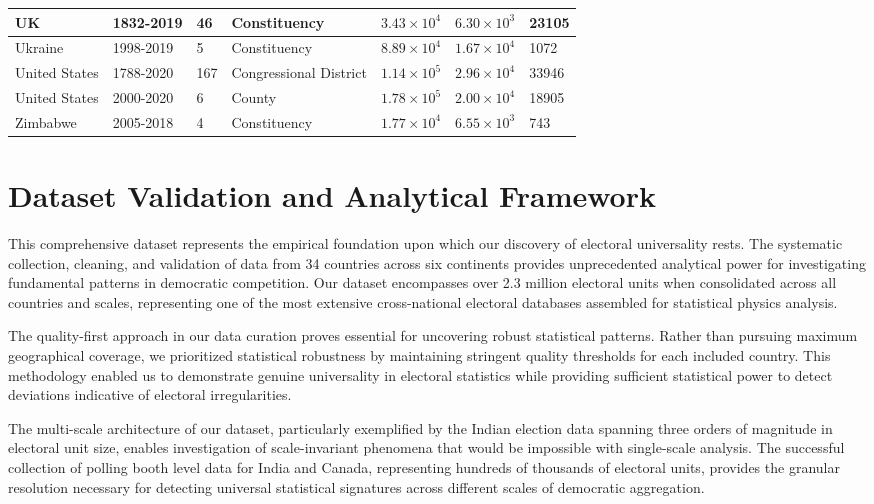 \begin{table}[h]
{\begin{tabular}{|l|l|l|l|l|l|l|}
    UK & 1832-2019 & 46 & Constituency & $3.43\times 10^{4}$ & $6.30\times 10^{3}$ & 23105\\ \hline
    Ukraine & 1998-2019 & 5 & Constituency & $8.89\times 10^{4}$ & $1.67\times 10^{4}$ & 1072\\ \hline
    United States & 1788-2020 & 167 & Congressional District & $1.14\times 10^{5}$ & $2.96\times 10^{4}$ & 33946\\ \hline
    United States & 2000-2020 & 6 & County & $1.78\times 10^{5}$ & $2.00\times 10^{4}$ & 18905\\ \hline
    Zimbabwe & 2005-2018 & 4 & Constituency & $1.77\times 10^{4}$ & $6.55\times 10^{3}$ & 743\\ \hline
    \end{tabular}
    }
    \end{table}
    
\newpage
\section{Dataset Validation and Analytical Framework}

This comprehensive dataset represents the empirical foundation upon which our discovery of electoral universality rests. The systematic collection, cleaning, and validation of data from 34 countries across six continents provides unprecedented analytical power for investigating fundamental patterns in democratic competition. Our dataset encompasses over 2.3 million electoral units when consolidated across all countries and scales, representing one of the most extensive cross-national electoral databases assembled for statistical physics analysis.

The quality-first approach in our data curation proves essential for uncovering robust statistical patterns. Rather than pursuing maximum geographical coverage, we prioritized statistical robustness by maintaining stringent quality thresholds for each included country. This methodology enabled us to demonstrate genuine universality in electoral statistics while providing sufficient statistical power to detect deviations indicative of electoral irregularities.

The multi-scale architecture of our dataset, particularly exemplified by the Indian election data spanning three orders of magnitude in electoral unit size, enables investigation of scale-invariant phenomena that would be impossible with single-scale analysis. The successful collection of polling booth level data for India and Canada, representing hundreds of thousands of electoral units, provides the granular resolution necessary for detecting universal statistical signatures across different scales of democratic aggregation.


